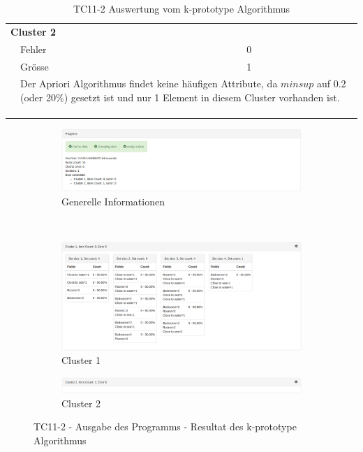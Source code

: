\begin{longtable}{ | l | l | l | l |}
	\multicolumn{4}{|l|}{\textbf{Cluster 2}} \\ \cline{2-4} 
	& Fehler & \multicolumn{2}{|l|}{0} \\ \cline{2-4} 
	& Grösse & \multicolumn{2}{|l|}{1} \\ \cline{2-4} 
	& \multicolumn{3}{|L{7.5cm}|}{Der Apriori Algorithmus findet keine häufigen Attribute, da $minsup$ auf 0.2 (oder 20\%) gesetzt ist und nur 1 Element in diesem Cluster vorhanden ist.} \\ \hline
	
	\rowcolor{tableheadcolor}
	\multicolumn{4}{|l|}{\bfseries Testergebnis} \\ \hline 
	\multicolumn{4}{|l|}{\cellcolor{green!25}} \\ \hline 
	
	\caption{TC11-2 Auswertung vom k-prototype Algorithmus}
	\centering
	\label{fig:testingfazit:testing:testcases:11:2}
\end{longtable}
\begin{figure}[H]
	\begin{subfigure}[t]{1\textwidth}
		\centering
		\includegraphics[width=1\textwidth]{images/tc11-kprototype-1}
		\caption{Generelle Informationen}
		\label{fig:testingfazit:testing:testcases:11-2-1}
	\end{subfigure} \\
	\begin{subfigure}[t]{1\textwidth}
		\centering
		\includegraphics[width=1\textwidth]{images/tc11-kprototype-2}
		\caption{Cluster 1}
		\label{fig:testingfazit:testing:testcases:11-2-2}
	\end{subfigure}
	\begin{subfigure}[t]{1\textwidth}
		\centering
		\includegraphics[width=1\textwidth]{images/tc11-kprototype-3}
		\caption{Cluster 2}
		\label{fig:testingfazit:testing:testcases:11-2-3}
	\end{subfigure}
	\caption{TC11-2 - Ausgabe des Programms - Resultat des k-prototype Algorithmus}
	\label{fig:testingfazit:testing:testcases:11-2}
\end{figure}

